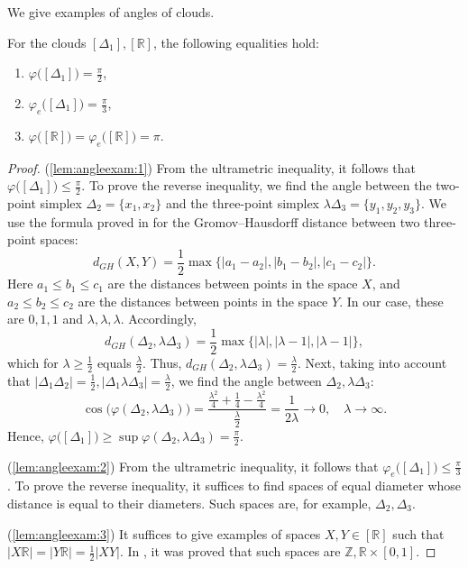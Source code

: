 We give examples of angles of clouds.
\begin{lemma}
  For the clouds \( [\Delta _{1}], [\mathbb{R}] \), the following
  equalities hold: \label{lem:angleexam}
  \begin{enumerate}
    \item \( \varphi \big([\Delta _{1}]\big) = \frac{\pi }{2}
      \),\label{lem:angleexam:1}
    \item \( \varphi_e \big([\Delta _{1}]\big) = \frac{\pi }{3}
      \),\label{lem:angleexam:2}
    \item \( \varphi \big([\mathbb{R}]\big) = \varphi_e
      \big([\mathbb{R}]\big) = \pi  \).\label{lem:angleexam:3}
  \end{enumerate}
\end{lemma}
\begin{proof}
  (\ref{lem:angleexam:1}) From the ultrametric inequality, it follows that \(
  \varphi \big([\Delta _1]\big)\le \frac{\pi }{2} \). To prove the reverse
  inequality, we find the angle between the two-point simplex \( \Delta
  _{2} = \{x_1, x_2\} \) and the three-point simplex \(
  \lambda \Delta _3  = \{y_1,y_2, y_3\}\). We use the formula proved in
  \cite{ivanov2016} for the Gromov--Hausdorff distance
  between two three-point spaces:
  \[
    d_{GH}(X,Y) = \frac{1}{2} \max\big\{ |a_1 - a_2|,|b_1 - b_2|,|c_1
    - c_2|\big\}.
  \]
  Here \( a_1 \le b_1 \le c_1 \) are the distances between points in
  the space \( X \), and \( a_2 \le b_2 \le c_2 \) are the distances between
  points in the space \( Y \). In our case, these are \( 0,1,1 \) and \(
  \lambda , \lambda , \lambda . \) Accordingly,
  \[
    d_{GH}(\Delta_2, \lambda \Delta _{3}) =\frac{1}{2}
    \max\big\{|\lambda |, | \lambda  -1|, |\lambda -1|\big\},
  \]
  which
  for \( \lambda \ge \frac 1 2 \) equals \(\frac \lambda 2 \). Thus, \(d
    _{GH}(\Delta _2, \lambda \Delta _3) =
  \frac{\lambda }{2} \). Next, taking into account that \( |\Delta _1
    \Delta _2|=\frac{1}{2}, |\Delta _1 \lambda \Delta
  _3|=\frac{\lambda }{2} \), we find the angle between \( \Delta _2,
  \lambda \Delta _3 \):
  \[ \cos \big(\varphi (\Delta _2 , \lambda \Delta _3)\big)
    =\frac{\frac{\lambda ^2}{4} + \frac{1}{4} - \frac{\lambda
    ^2}{4}}{\frac{\lambda }{2}} = \frac{1}{2 \lambda }
    \rightarrow 0,\quad \lambda \rightarrow \infty.
  \]
  Hence, \( \varphi \big([\Delta _1]\big) \ge \sup \varphi (\Delta _2,
  \lambda \Delta _3) = \frac \pi 2. \)

  (\ref{lem:angleexam:2}) From the ultrametric inequality, it follows that \(
  \varphi_e \big([\Delta _1]\big)\le \frac{\pi }{3} \). To prove the reverse
  inequality, it suffices to find spaces of equal diameter whose distance is
  equal to their diameters. Such spaces are, for example, \( \Delta
  _2, \Delta _3 \).

  (\ref{lem:angleexam:3}) It suffices to give examples of spaces \( X,Y\in
  [\mathbb{R}] \) such that \( |X \mathbb{R}| = |Y \mathbb{R}| = \frac 1 2
  |XY|. \) In \cite{mikhailovUnreleased}, it was proved that such
  spaces are \( \mathbb{Z}, \mathbb{R}\times
  [0,1] \).

\end{proof}
